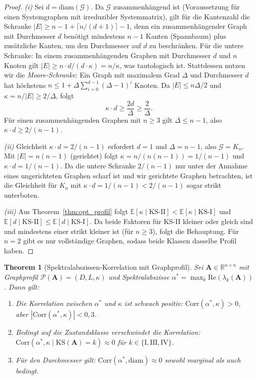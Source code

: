 \documentclass[a4paper, 12pt, twoside, openright]{report}
\newtheorem{theorem}{Theorem}[section]
\theoremstyle{definition}
\theoremstyle{definition}
\newcommand{\R}{\mathbb{R}}
\newcommand{\vA}{\bm{A}}
\newcommand{\re}{\mathrm{Re}}
\newcommand{\KS}{\mathrm{KS}}
\begin{document}
\begin{proof}
\textit{(i)} Sei $d = \mathrm{diam}(\mathcal{G})$. Da $\mathcal{G}$ zusammenhängend
ist (Voraussetzung für einen Systemgraphen mit irreduzibler Systemmatrix), gilt für
die Kantenzahl die Schranke $|E| \geq n - 1 + \lceil n/(d+1) \rceil - 1$, denn
ein zusammenhängender Graph mit Durchmesser $d$ benötigt mindestens $n-1$ Kanten
(Spannbaum) plus zusätzliche Kanten, um den Durchmesser auf $d$ zu beschränken.
Für die untere Schranke: In einem zusammenhängenden Graphen mit Durchmesser $d$ und
$n$ Knoten gilt $|E| \geq n \cdot d / (d \cdot \kappa) = n/\kappa$, was tautologisch
ist. Stattdessen nutzen wir die \emph{Moore-Schranke}: Ein Graph mit maximalem Grad
$\Delta$ und Durchmesser $d$ hat höchstens $n \leq 1 + \Delta \sum_{i=0}^{d-1}
(\Delta - 1)^i$ Knoten. Da $|E| \leq n\Delta / 2$ und $\kappa = n/|E| \geq 2/\Delta$,
folgt
\[
  \kappa \cdot d \geq \frac{2d}{\Delta} \geq \frac{2}{\Delta}.
\]
Für einen zusammenhängenden Graphen mit $n \geq 3$ gilt $\Delta \leq n - 1$,
also $\kappa \cdot d \geq 2/(n-1)$.

\textit{(ii)} Gleichheit $\kappa \cdot d = 2/(n-1)$ erfordert $d = 1$ und
$\Delta = n-1$, also $\mathcal{G} = K_n$. Mit $|E| = n(n-1)$ (gerichtet) folgt
$\kappa = n/(n(n-1)) = 1/(n-1)$ und $\kappa \cdot d = 1/(n-1)$.
Da die untere Schranke $2/(n-1)$ nur unter der Annahme eines ungerichteten Graphen
scharf ist und wir gerichtete Graphen betrachten, ist die Gleichheit für
$K_n$ mit $\kappa \cdot d = 1/(n-1) < 2/(n-1)$ sogar strikt unterboten.

\textit{(iii)} Aus Theorem~\ref{thm:opt_profil} folgt $\mathbb{E}[\kappa \mid
\KS\text{-II}] < \mathbb{E}[\kappa \mid \KS\text{-I}]$ und
$\mathbb{E}[d \mid \KS\text{-II}] \leq \mathbb{E}[d \mid \KS\text{-I}]$.
Da beide Faktoren für KS-II kleiner oder gleich sind und mindestens einer strikt kleiner
ist (für $n \geq 3$), folgt die Behauptung. Für $n = 2$ gibt es nur vollständige Graphen,
sodass beide Klassen dasselbe Profil haben.
\end{proof}

\begin{theorem}[Spektralabszissen-Korrelation mit Graphprofil]
\label{thm:spektral_kappa}
Sei $\vA \in \R^{n \times n}$ mit Graphprofil $\mathcal{P}(\vA) = (D, L, \kappa)$
und Spektralabszisse $\alpha^* = \max_k \re(\lambda_k(\vA))$. Dann gilt:
\begin{enumerate}[label=(\roman*)]
  \item Die Korrelation zwischen $\alpha^*$ und $\kappa$ ist schwach positiv:
    $\mathrm{Corr}(\alpha^*, \kappa) > 0$, aber $|\mathrm{Corr}(\alpha^*, \kappa)| < 0{,}3$.
  \item Bedingt auf die Zustandsklasse verschwindet die Korrelation:
    $\mathrm{Corr}(\alpha^*, \kappa \mid \KS(\vA) = k) \approx 0$ für $k \in \{\mathrm{I},
    \mathrm{III}, \mathrm{IV}\}$.
  \item Für den Durchmesser gilt:
    $\mathrm{Corr}(\alpha^*, \mathrm{diam}) \approx 0$ sowohl marginal als auch bedingt.
\end{enumerate}
\end{theorem}
\end{document}
